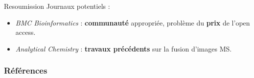 \documentclass[10pt]{beamer}
\begin{document}
\begin{frame}{Resoumission}
  Journaux potentiels :
  \begin{itemize}
  \item \textit{BMC Bioinformatics} : \textbf{communauté} appropriée, problème du \textbf{prix} de l'open access.
  \item \textit{Analytical Chemistry} : \textbf{travaux précédents} sur la fusion d'images MS.
  \end{itemize}
\end{frame}







\appendix
{}


\begin{frame}[allowframebreaks]
  \frametitle{Références}
  
  \scriptsize{
    
  }
\end{frame}
\end{document}
